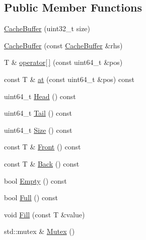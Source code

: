 \subsection*{Public Member Functions}
\begin{DoxyCompactItemize}
\item 
\hyperlink{classapollo_1_1cyber_1_1data_1_1CacheBuffer_aa7c9d5f696010ed4698485be38b7765c}{Cache\-Buffer} (uint32\-\_\-t size)
\item 
\hyperlink{classapollo_1_1cyber_1_1data_1_1CacheBuffer_af74bd9506613e92e1ca1b17f648919c8}{Cache\-Buffer} (const \hyperlink{classapollo_1_1cyber_1_1data_1_1CacheBuffer}{Cache\-Buffer} \&rhs)
\item 
T \& \hyperlink{classapollo_1_1cyber_1_1data_1_1CacheBuffer_acf961c03dfb313efee16ecc82e2dd173}{operator\mbox{[}$\,$\mbox{]}} (const uint64\-\_\-t \&pos)
\item 
const T \& \hyperlink{classapollo_1_1cyber_1_1data_1_1CacheBuffer_a6ff94280150adba58355143f04074dfc}{at} (const uint64\-\_\-t \&pos) const 
\item 
uint64\-\_\-t \hyperlink{classapollo_1_1cyber_1_1data_1_1CacheBuffer_ac3571527fa181e9d502e6ddc1cff1781}{Head} () const 
\item 
uint64\-\_\-t \hyperlink{classapollo_1_1cyber_1_1data_1_1CacheBuffer_a3981ddab2e7ec5018623b4598b6d624b}{Tail} () const 
\item 
uint64\-\_\-t \hyperlink{classapollo_1_1cyber_1_1data_1_1CacheBuffer_a6a8aa1c796dbbe2c30d44da9073c44b4}{Size} () const 
\item 
const T \& \hyperlink{classapollo_1_1cyber_1_1data_1_1CacheBuffer_ac2fb55bdcf49b1e535880445bcffd034}{Front} () const 
\item 
const T \& \hyperlink{classapollo_1_1cyber_1_1data_1_1CacheBuffer_a9bc0ad702d7471e25d67c53a9ff14a6a}{Back} () const 
\item 
bool \hyperlink{classapollo_1_1cyber_1_1data_1_1CacheBuffer_a274a1d5f8a68f932e2e98c92e6f03223}{Empty} () const 
\item 
bool \hyperlink{classapollo_1_1cyber_1_1data_1_1CacheBuffer_acfdc5bac267080f793233648228f6463}{Full} () const 
\item 
void \hyperlink{classapollo_1_1cyber_1_1data_1_1CacheBuffer_af3ebad1c52b091d2b3e540d98a9e0bd2}{Fill} (const T \&value)
\item 
std\-::mutex \& \hyperlink{classapollo_1_1cyber_1_1data_1_1CacheBuffer_abd49ff1c56aa99e1bf38b6f0adc8df98}{Mutex} ()
\end{DoxyCompactItemize}

